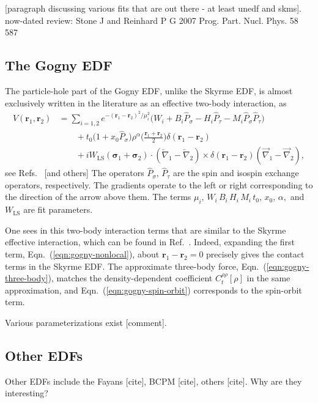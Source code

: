 \documentclass[../thesis.tex]{subfiles}
\begin{document}
[paragraph discussing various fits that are out there - at least unedf and skms]. now-dated review: Stone J and Reinhard P G 2007 Prog. Part. Nucl. Phys. 58 587

\subsection{The Gogny EDF}
The particle-hole part of the Gogny EDF, unlike the Skyrme EDF, is almost exclusively written in the literature as an effective two-body interaction, as
\begin{subequations}
	\begin{align}
		\hat{V}(\bm{r}_1,\bm{r}_2)&=\sum_{i=1,2}e^{-(\bm{r}_1-\bm{r}_2)^2/\mu_i^2}\big(W_i+B_i\hat{P}_\sigma-H_i\hat{P}_\tau-M_i\hat{P}_\sigma\hat{P}_\tau\big)\label{eqn:gogny-nonlocal}\\
		&\qquad +t_0\big(1+x_0\hat{P}_\sigma\big)\rho^\alpha\bigg(\frac{\bm{r}_1+\bm{r}_2}{2}\bigg)\delta(\bm{r}_1-\bm{r}_2)\label{eqn:gogny-three-body}\\
		&\qquad +iW_{\textrm{LS}}(\bm{\sigma}_1+\bm{\sigma}_2)\cdot(\overleftarrow{\nabla}_1-\overleftarrow{\nabla}_2)\times\delta(\bm{r}_1-\bm{r}_2)(\overrightarrow{\nabla}_1-\overrightarrow{\nabla}_2)\label{eqn:gogny-spin-orbit},
	\end{align}
\end{subequations}
see Refs.~\cite{Perez2017} [and others] The operators $\hat{P}_\sigma,\,\hat{P}_\tau$ are the spin and isospin exchange operators, respectively. The gradients operate to the left or right corresponding to the direction of the arrow above them. The terms $\mu_i,\,W_i\,B_i\,H_i\,M_i\,t_0,\,x_0,\,\alpha,$ and $W_\textrm{LS}$ are fit parameters.

One sees in this two-body interaction terms that are similar to the Skyrme effective interaction, which can be found in Ref.~\cite{Vautherin1972}. Indeed, expanding the first term, Eqn.~(\ref{eqn:gogny-nonlocal}), about $\bm{r}_1-\bm{r}_2=0$ precisely gives the contact terms in the Skyrme EDF. The approximate three-body force, Eqn.~(\ref{eqn:gogny-three-body}), matches the density-dependent coefficient $C_t^{\rho\rho}[\rho]$ in the same approximation, and Eqn.~(\ref{eqn:gogny-spin-orbit}) corresponds to the spin-orbit term.

Various parameterizations exist [comment].

\subsection{Other EDFs}
Other EDFs include the Fayans [cite], BCPM [cite], others [cite]. Why are they interesting?
\end{document}
